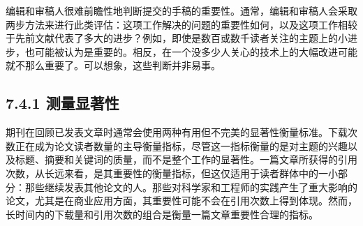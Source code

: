 编辑和审稿人很难前瞻性地判断提交的手稿的重要性。通常，编辑和审稿人会采取两步方法来进行此类评估：这项工作解决的问题的重要性如何，以及这项工作相较于先前文献代表了多大的进步？例如，即使是数百或数千读者关注的主题上的小进步，也可能被认为是重要的。相反，在一个没多少人关心的技术上的大幅改进可能就不那么重要了。可以想象，这些判断并非易事。

\subsection*{7.4.1 测量显著性}
期刊在回顾已发表文章时通常会使用两种有用但不完美的显著性衡量标准。下载次数正在成为论文读者数量的主导衡量指标，尽管这一指标衡量的是对主题的兴趣以及标题、摘要和关键词的质量，而不是整个工作的显著性。一篇文章所获得的引用次数，从长远来看，是其重要性的衡量指标，但这仅适用于读者群体中的一小部分：那些继续发表其他论文的人。那些对科学家和工程师的实践产生了重大影响的论文，尤其是在商业应用方面，其重要性可能不会在引用次数上得到体现。然而，长时间内的下载量和引用次数的组合是衡量一篇文章重要性合理的指标。

